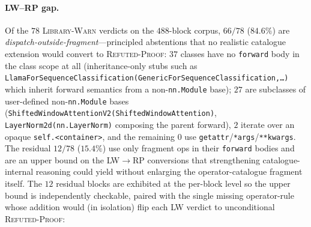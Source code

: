 \paragraph{LW--RP gap.} Of the $78$
\textsc{Library-Warn} verdicts on the $488$-block corpus,
$66/78$ ($84.6\%$) are
\emph{dispatch-outside-fragment}---principled abstentions that no
realistic catalogue extension would convert to \textsc{Refuted-Proof}:
$37$ classes have no \texttt{forward} body in the class scope at all
(inheritance-only stubs such as
\texttt{LlamaForSequenceClassification(GenericForSequenceClassification,\dots)}
which inherit forward semantics from a non-\texttt{nn.Module} base);
$27$ are subclasses of user-defined non-\texttt{nn.Module} bases
(\texttt{ShiftedWindowAttentionV2(ShiftedWindowAttention)},
\texttt{LayerNorm2d(nn.LayerNorm)} composing the parent forward),
$2$ iterate over an opaque \texttt{self.<container>}, and the
remaining $0$ use \texttt{getattr}/\texttt{*args}/\texttt{**kwargs}.
The residual $12/78$ ($15.4\%$) use only fragment ops in their
\texttt{forward} bodies and are an upper bound on the
\textsc{LW}$\to$\textsc{RP} conversions that strengthening
catalogue-internal reasoning could yield without enlarging the
operator-catalogue fragment itself. The $12$ residual blocks are
exhibited at the per-block level so the upper bound is independently
checkable, paired with the single missing operator-rule whose addition
would (in isolation) flip each LW verdict to unconditional
\textsc{Refuted-Proof}:
